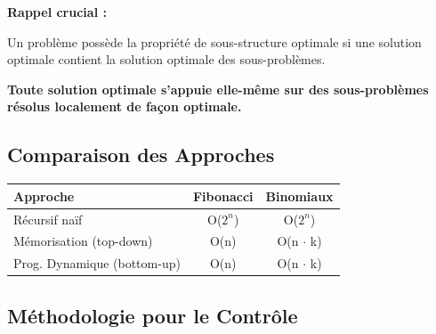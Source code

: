 \documentclass[12pt,a4paper]{article}
\begin{document}
\begin{definition}
\textbf{Rappel crucial :}

Un problème possède la propriété de sous-structure optimale si une solution optimale contient la solution optimale des sous-problèmes.

\textcolor{importantrouge}{\textbf{Toute solution optimale s'appuie elle-même sur des sous-problèmes résolus localement de façon optimale.}}
\end{definition}

\subsection{Comparaison des Approches}

\begin{center}
\colorbox{fondbleu}{
\begin{tabular}{|l|c|c|}
\hline
\rowcolor{titrebleu!30}
\textbf{Approche} & \textbf{Fibonacci} & \textbf{Binomiaux} \\
\hline
Récursif naïf & O($2^n$) & O($2^n$) \\
\hline
Mémorisation (top-down) & O(n) & O(n $\cdot$ k) \\
\hline
\rowcolor{defvert!20}
Prog. Dynamique (bottom-up) & \textcolor{defvert}{O(n)} & \textcolor{defvert}{O(n $\cdot$ k)} \\
\hline
\end{tabular}}
\end{center}

\subsection{Méthodologie pour le Contrôle}
\end{document}
